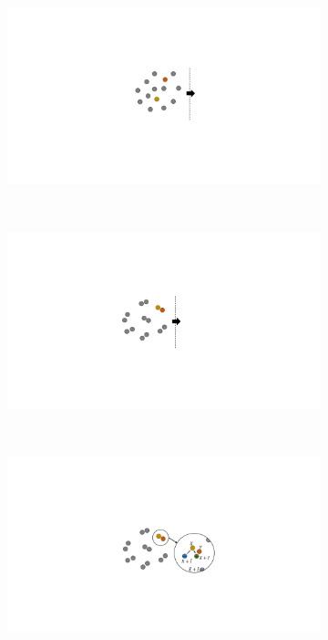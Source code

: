
\begin{figure}[!htbp]
    \centering
    \begin{subfigure}[b]{0.15\textwidth}
      \includegraphics[width=\textwidth]{Img/fig_5_cat_a.pdf}
      \caption{}
      \label{fig:5_cat_a}
    \end{subfigure}%
    ~%
    \begin{subfigure}[b]{0.15\textwidth}
      \includegraphics[width=\textwidth]{Img/fig_5_cat_b.pdf}
      \caption{}
      \label{fig:5_cat_b}
    \end{subfigure}
    \\%
    \begin{subfigure}[b]{0.15\textwidth}
      \includegraphics[width=\textwidth]{Img/fig_5_cat_c.pdf}
      \caption{}
      \label{fig:5_cat_c}
    \end{subfigure}%
    \label{fig:5_cat}
\end{figure}